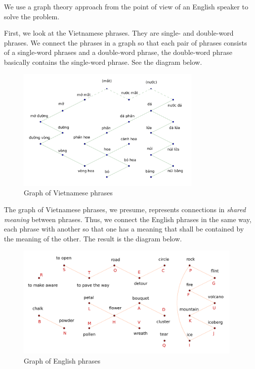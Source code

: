 \documentclass{article}
\begin{document}
\begin{soln}
    We use a graph theory approach from the point of view of an English speaker to solve the problem.

    First, we look at the Vietnamese phrases. They are single- and double-word phrases.
    We connect the phrases in a graph so that each pair of phrases consists of a single-word phrases and a double-word phrase,
    the double-word phrase basically contains the single-word phrase. See the diagram below.

    \begin{figure}[h]
        \centering
        \begin{minipage}[t]{9cm}
            \centering
            \includegraphics[width=9cm]{./svg/pdf/hc-2022-2-2-2-1.pdf}
        \caption{Graph of Vietnamese phrases}
        \end{minipage}
    \end{figure}

    The graph of Vietnamese phrases, we presume, represents connections in \textit{shared meaning} between phrases.
    Thus, we connect the English phrases in the same way,
    each phrase with another so that one has a meaning that shall be contained by the meaning of the other.
    The result is the diagram below.

    \begin{figure}[h]
        \centering
        \begin{minipage}[t]{11cm}
            \centering
            \includegraphics[width=11cm]{./svg/pdf/hc-2022-2-2-2-2.pdf}
        \caption{Graph of English phrases}
        \end{minipage}
    \end{figure}


\end{soln}
\end{document}

